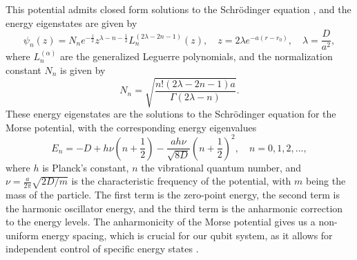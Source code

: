 \documentclass{subfiles}
\begin{document}
This potential admits closed form solutions to the Schrödinger equation \cite{piela2006ideas, morse1929diatomic}, and the energy eigenstates are given by
\begin{equation}
    \psi_n(z) = N_n e^{-\frac{z}{2}}z^{\lambda - n - \frac{1}{2}}L_n^{(2\lambda - 2n - 1)}(z), \quad z = 2\lambda e^{-a(r-r_0)}, \quad \lambda = \frac{D}{a^2},\label{eq:morse_eigenstates}
\end{equation}
where $L_n^{(\alpha)}$ are the generalized Leguerre polynomials, and the normalization constant $N_n$ is given by
\begin{equation*}
    N_n = \sqrt{\frac{n! (2\lambda - 2n - 1)a}{\Gamma(2\lambda - n)}}.
\end{equation*}
These energy eigenstates are the solutions to the Schrödinger equation for the Morse potential, with the corresponding energy eigenvalues
\begin{equation}
    E_n = -D + h\nu(n + \frac{1}{2}) - \frac{ah\nu}{\sqrt{8D}}(n + \frac{1}{2})^2, \quad n = 0, 1, 2, ...,\label{eq:morse_energy_levels}
\end{equation}
where $h$ is Planck's constant, $n$ the vibrational quantum number, and $\nu=\frac{a}{2\pi}\sqrt{2D / m}$ is the characteristic frequency of the potential, with $m$ being the mass of the particle. The first term is the zero-point energy, the second term is the harmonic oscillator energy, and the third term is the anharmonic correction to the energy levels. The anharmonicity of the Morse potential gives us a non-uniform energy spacing, which is crucial for our qubit system, as it allows for independent control of specific energy states \cite{piela2006ideas, morse1929diatomic}.

\end{document}
